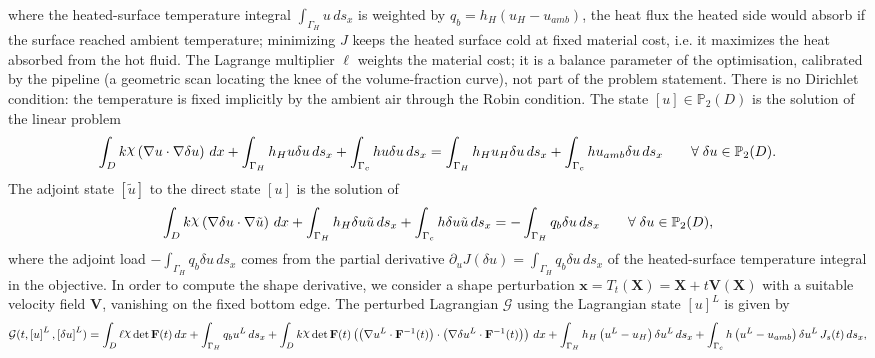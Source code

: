 \documentclass[preview]{standalone}
\let\oldcdot\cdot
\let\cdot\oldcdot
\begin{document}
where the heated-surface temperature integral $\int_{\Gamma_H} u \,ds_x$ is weighted by $q_b = h_H \left( u_H - u_{amb}\right)$, the heat flux the heated side would absorb if the surface reached ambient temperature; minimizing $J$ keeps the heated surface cold at fixed material cost, i.e. it maximizes the heat absorbed from the hot fluid.  The Lagrange multiplier $\ell$ weights the material cost; it is a balance parameter of the optimisation, calibrated by the pipeline (a geometric scan locating the knee of the volume-fraction curve), not part of the problem statement.  There is no Dirichlet condition: the temperature is fixed implicitly by the ambient air through the Robin condition.
The state $\left[ u\right] \in \mathbb P_{2}(D)$ is the solution of the linear problem
\begin{dmath*}
\int_{D} k \raisebox{\depth}{$\chi$} \left(  \nabla u  \cdot  \nabla \delta u  \right) \,dx + \int_{\Gamma_H} h_H u \delta u \,ds_x + \int_{\Gamma_c} h u \delta u \,ds_x = \int_{\Gamma_H} h_H u_{H} \delta u \,ds_x + \int_{\Gamma_c} h u_{amb} \delta u \,ds_x \qquad \forall\; {\delta u\in \mathbb P_{2}(D)} .
\end{dmath*}
The adjoint state $\left[ \tilde u\right]$ to the direct state $\left[ u\right]$ is the solution of
\begin{dmath*}
\int_{D} k \raisebox{\depth}{$\chi$} \left(  \nabla \delta u  \cdot  \nabla \tilde u  \right) \,dx + \int_{\Gamma_H} h_H \delta u \tilde u \,ds_x + \int_{\Gamma_c} h \delta u \tilde u \,ds_x = - \int_{\Gamma_H} q_b \delta u \,ds_x \qquad \forall\; {\delta u\in \mathbb P_{2}(D)} ,
\end{dmath*}
where the adjoint load $- \int_{\Gamma_H} q_b \delta u \,ds_x$ comes from the partial derivative $\partial_{u} J(\delta u) = \int_{\Gamma_H} q_b \delta u \,ds_x$ of the heated-surface temperature integral in the objective.
In order to compute the shape derivative, we consider a shape perturbation $\mathbf x = T_t(\mathbf X) = \mathbf X + t \mathbf  V(\mathbf X)$ with a suitable velocity field $\mathbf V$, vanishing on the fixed bottom edge.  The perturbed Lagrangian $\mathcal G$ using the Lagrangian state $\left[ u\right]^{L}$ is given by
\begin{dmath*}
\mathcal G(t,\left[ u\right]^{L},\left[ \delta u\right]^{L}) = \int_{D} \ell \raisebox{\depth}{$\chi$}  \operatorname{det}\mathbf F( t )  \,dx + \int_{\Gamma_H} q_b u^{L} \,ds_x +  \int_{D} k \raisebox{\depth}{$\chi$}  \operatorname{det}\mathbf F( t )  \left( \left(  \nabla u^{L} \cdot  \mathbf F^{-1}(t) \right) \cdot \left(  \nabla \delta u^{L} \cdot  \mathbf F^{-1}(t) \right) \right) \,dx + \int_{\Gamma_H} h_H \left( u^{L} - u_{H}\right) \delta u^{L} \,ds_x + \int_{\Gamma_c} h \left( u^{L} - u_{amb}\right) \delta u^{L} \,J_{s}(t) \,ds_x ,
\end{dmath*}
\end{document}
